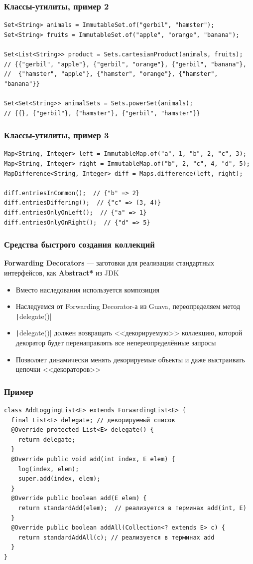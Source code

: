 \documentclass[xetex,mathserif,serif]{beamer}
\begin{document}
	\begin{frame}[fragile]
		\frametitle{Классы-утилиты, пример 2}
		\begin{verbatim}
Set<String> animals = ImmutableSet.of("gerbil", "hamster");
Set<String> fruits = ImmutableSet.of("apple", "orange", "banana");

Set<List<String>> product = Sets.cartesianProduct(animals, fruits);
// {{"gerbil", "apple"}, {"gerbil", "orange"}, {"gerbil", "banana"},
//  {"hamster", "apple"}, {"hamster", "orange"}, {"hamster", "banana"}}

Set<Set<String>> animalSets = Sets.powerSet(animals);
// {{}, {"gerbil"}, {"hamster"}, {"gerbil", "hamster"}}
		\end{verbatim}
\end{frame}

	\begin{frame}[fragile]
		\frametitle{Классы-утилиты, пример 3}
		\begin{verbatim}
Map<String, Integer> left = ImmutableMap.of("a", 1, "b", 2, "c", 3);
Map<String, Integer> right = ImmutableMap.of("b", 2, "c", 4, "d", 5);
MapDifference<String, Integer> diff = Maps.difference(left, right);

diff.entriesInCommon();  // {"b" => 2}
diff.entriesDiffering();  // {"c" => (3, 4)}
diff.entriesOnlyOnLeft();  // {"a" => 1}
diff.entriesOnlyOnRight();  // {"d" => 5}
		\end{verbatim}
\end{frame}

	\begin{frame}
		\frametitle{Средства быстрого создания коллекций}
		\textbf{Forwarding Decorators} --- заготовки для реализации стандартных интерфейсов, как \textbf{Abstract*} из JDK
		\begin{itemize}
			\item Вместо наследования используется композиция
			\item Наследуемся от Forwarding Decorator-а из Guava, переопределяем метод \texttt|delegate()|
			\item \texttt|delegate()| должен возвращать <<декорируемую>> коллекцию, которой декоратор будет перенаправлять все непереопределённые запросы
			\item Позволяет динамически менять декорируемые объекты и даже выстраивать цепочки <<декораторов>>
		\end{itemize}
	\end{frame}

	\begin{frame}[fragile]
		\frametitle{Пример}
		\begin{verbatim}
class AddLoggingList<E> extends ForwardingList<E> {
  final List<E> delegate; // декорируемый список
  @Override protected List<E> delegate() {
    return delegate;
  }
  @Override public void add(int index, E elem) {
    log(index, elem);
    super.add(index, elem);
  }
  @Override public boolean add(E elem) {
    return standardAdd(elem);  // реализуется в терминах add(int, E)
  }
  @Override public boolean addAll(Collection<? extends E> c) {
    return standardAddAll(c); // реализуется в терминах add
  }
}
		\end{verbatim}
\end{frame}
\end{document}
